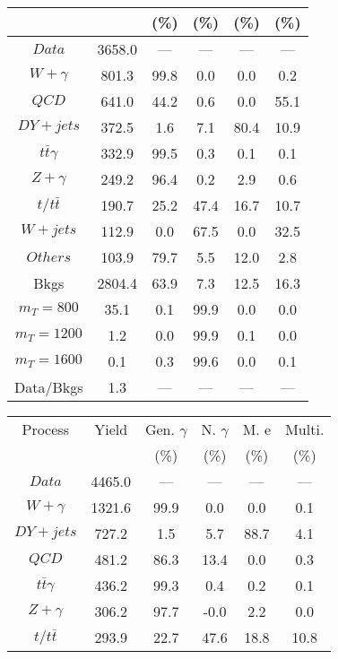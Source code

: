 \begin{figure}
\begin{minipage}[c]{0.32\textwidth}
{\begin{tabular}{cccccc}
 &  & (\%) & (\%) & (\%) & (\%)  \\
\hline
                                                                      $ Data $ &  3658.0 &  --- &  --- &  --- &  ---\\
$ W+\gamma $ &  801.3 &  99.8 &  0.0 &  0.0 &  0.2\\
$ QCD $ &  641.0 &  44.2 &  0.6 &  0.0 &  55.1\\
$ DY+jets $ &  372.5 &  1.6 &  7.1 &  80.4 &  10.9\\
$ t\bar{t}\gamma $ &  332.9 &  99.5 &  0.3 &  0.1 &  0.1\\
$ Z+\gamma $ &  249.2 &  96.4 &  0.2 &  2.9 &  0.6\\
$ t/t\bar{t} $ &  190.7 &  25.2 &  47.4 &  16.7 &  10.7\\
$ W+jets $ &  112.9 &  0.0 &  67.5 &  0.0 &  32.5\\
$ Others $ &  103.9 &  79.7 &  5.5 &  12.0 &  2.8\\
Bkgs &  2804.4 &  63.9 &  7.3 &  12.5 &  16.3\\
$ m_{T} = 800 $ &  35.1 &  0.1 &  99.9 &  0.0 &  0.0\\
$ m_{T} = 1200 $ &  1.2 &  0.0 &  99.9 &  0.1 &  0.0\\
$ m_{T} = 1600 $ &  0.1 &  0.3 &  99.6 &  0.0 &  0.1\\
Data/Bkgs &  1.3 &  --- &  --- &  --- &  ---\\
\hline
\end{tabular}
}
\end{minipage}
\begin{minipage}[c]{0.32\textwidth}
\centering
\tiny{
\begin{tabular}{cccccc}
\hline
Process & Yield & Gen. $\gamma$ & N. $\gamma$ & M. e & Multi. \\
 &  & (\%) & (\%) & (\%) & (\%)  \\
\hline
                                                                      $ Data $ &  4465.0 &  --- &  --- &  --- &  ---\\
$ W+\gamma $ &  1321.6 &  99.9 &  0.0 &  0.0 &  0.1\\
$ DY+jets $ &  727.2 &  1.5 &  5.7 &  88.7 &  4.1\\
$ QCD $ &  481.2 &  86.3 &  13.4 &  0.0 &  0.3\\
$ t\bar{t}\gamma $ &  436.2 &  99.3 &  0.4 &  0.2 &  0.1\\
$ Z+\gamma $ &  306.2 &  97.7 &  -0.0 &  2.2 &  0.0\\
$ t/t\bar{t} $ &  293.9 &  22.7 &  47.6 &  18.8 &  10.8\\

\end{tabular}}
\end{minipage}
\end{figure}
